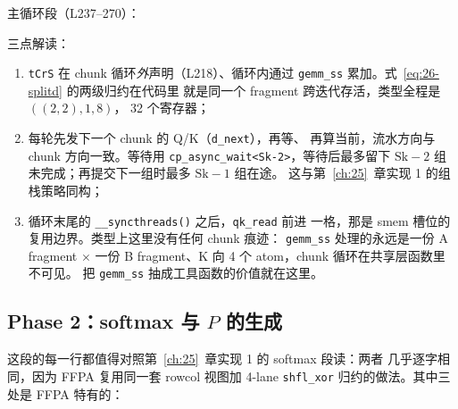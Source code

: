 主循环段（L237--270）：



三点解读：

\begin{enumerate}[itemsep=2pt,topsep=2pt]
  \item \texttt{tCrS} 在 chunk 循环\emph{外}声明（L218）、循环内通过
        \texttt{gemm\_ss} 累加。式~\eqref{eq:26-splitd} 的两级归约在代码里
        就是同一个 fragment 跨迭代存活，类型全程是 $((2,2),1,8)$，
        32 个寄存器；
  \item 每轮先发下一个 chunk 的 Q/K（\texttt{d\_next}），再等、
        再算当前，流水方向与 chunk 方向一致。等待用
        \texttt{cp\_\allowbreak{}async\_\allowbreak{}wait\allowbreak{}<Sk-2>}，等待后最多留下
        $\mathrm{Sk}-2$ 组未完成；再提交下一组时最多 $\mathrm{Sk}-1$ 组在途。
        这与第~\ref{ch:25}~章实现 1 的组栈策略同构；
  \item 循环末尾的 \texttt{\_\allowbreak{}\_\allowbreak{}syncthreads\allowbreak{}()} 之后，\texttt{qk\_read} 前进
        一格，那是 smem 槽位的复用边界。类型上这里没有任何 chunk 痕迹：
        \texttt{gemm\_ss} 处理的永远是一份 A fragment $\times$
        一份 B fragment、K 向 4 个 atom，chunk 循环在共享层函数里不可见。
        把 \texttt{gemm\_ss} 抽成工具函数的价值就在这里。
\end{enumerate}

\subsection{Phase 2：softmax 与 $P$ 的生成}



这段的每一行都值得对照第~\ref{ch:25}~章实现 1 的 softmax 段读：两者
几乎逐字相同，因为 FFPA 复用同一套 rowcol 视图加 4-lane \texttt{shfl\_xor}
归约的做法。其中三处是 FFPA 特有的：

